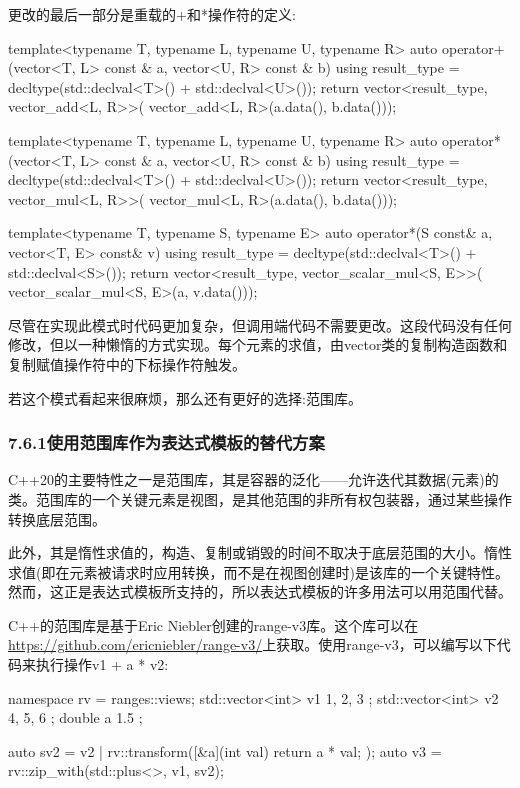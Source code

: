 更改的最后一部分是重载的+和*操作符的定义:

\begin{cpp}
template<typename T, typename L, typename U, typename R>
auto operator+(vector<T, L> const & a,
vector<U, R> const & b)
{
	using result_type = decltype(std::declval<T>() +
								 std::declval<U>());
	return vector<result_type, vector_add<L, R>>(
		vector_add<L, R>(a.data(), b.data()));
}

template<typename T, typename L, typename U, typename R>
auto operator*(vector<T, L> const & a,
vector<U, R> const & b)
{
	using result_type = decltype(std::declval<T>() +
								 std::declval<U>());
	return vector<result_type, vector_mul<L, R>>(
		vector_mul<L, R>(a.data(), b.data()));
}

template<typename T, typename S, typename E>
auto operator*(S const& a, vector<T, E> const& v)
{
	using result_type = decltype(std::declval<T>() +
								 std::declval<S>());
	return vector<result_type, vector_scalar_mul<S, E>>(
		vector_scalar_mul<S, E>(a, v.data()));
}
\end{cpp}

尽管在实现此模式时代码更加复杂，但调用端代码不需要更改。这段代码没有任何修改，但以一种懒惰的方式实现。每个元素的求值，由vector类的复制构造函数和复制赋值操作符中的下标操作符触发。

若这个模式看起来很麻烦，那么还有更好的选择:范围库。

\subsubsection{7.6.1\hspace{0.2cm}使用范围库作为表达式模板的替代方案}

C++20的主要特性之一是范围库，其是容器的泛化——允许迭代其数据(元素)的类。范围库的一个关键元素是视图，是其他范围的非所有权包装器，通过某些操作转换底层范围。

此外，其是惰性求值的，构造、复制或销毁的时间不取决于底层范围的大小。惰性求值(即在元素被请求时应用转换，而不是在视图创建时)是该库的一个关键特性。然而，这正是表达式模板所支持的，所以表达式模板的许多用法可以用范围代替。

C++的范围库是基于Eric Niebler创建的range-v3库。这个库可以在\url{https://github.com/ericniebler/range-v3/}上获取。使用range-v3，可以编写以下代码来执行操作v1 + a * v2:

\begin{cpp}
namespace rv = ranges::views;
std::vector<int> v1{ 1, 2, 3 };
std::vector<int> v2{ 4, 5, 6 };
double a { 1.5 };

auto sv2 = v2 |
		   rv::transform([&a](int val) {return a * val; });
auto v3 = rv::zip_with(std::plus<>{}, v1, sv2);
\end{cpp}

